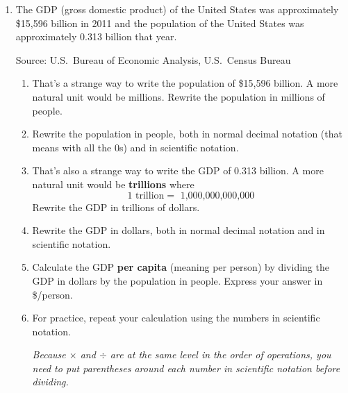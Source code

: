 \begin{enumerate}
\item The GDP (gross domestic product) of the United States was approximately \$15,596 billion in 2011 and the population of the United States was approximately 0.313 billion that year.  \hfill \begin{footnotesize} Source:  U.S.\ Bureau of Economic Analysis, U.S.\ Census Bureau\end{footnotesize}
\begin{enumerate}
\item That's a strange way to write the population of \$15,596 billion.  A more natural unit would be millions.  Rewrite the population in millions of people. \vfill
\item Rewrite the population in people, both in normal decimal notation (that means with all the 0s) and in scientific notation. \vfill
\item That's also a strange way to write the GDP of  0.313 billion.   A more natural unit would be \textbf{trillions} where
$$1 \text{ trillion} =  \text{ 1,000,000,000,000}$$
Rewrite the GDP in trillions of dollars. \vfill
\item Rewrite the GDP in dollars, both in normal decimal notation and in scientific notation. \vfill
\item Calculate the GDP \textbf{per capita} (meaning per person) by dividing the GDP in dollars by the population in people.  Express your answer in \$/person. \vfill
\item For practice, repeat your calculation using the numbers in scientific notation.  
 
 \emph{Because $\times$ and $\div$ are at the same level in the order of operations, you need to put parentheses around each number in scientific notation before dividing.} \vfill
\end{enumerate}

\end{enumerate} 

